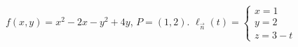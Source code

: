 {$f(x,y) = x^2-2x-y^2+4y$,   $P=(1,2)$.
}
{
$\ell_{\vec n}(t) = \left\{\begin{array}{l} x = 1\\ y = 2 \\ z = 3 -t \end{array} \right.$ 
}
